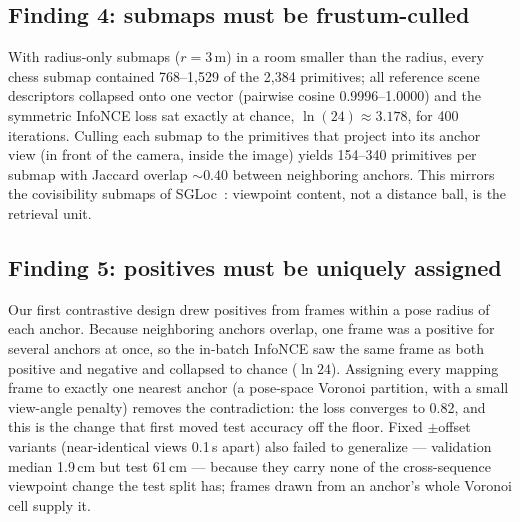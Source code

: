 \documentclass[journal]{IEEEtran}
\begin{document}
\subsection{Finding 4: submaps must be frustum-culled}
With radius-only submaps ($r{=}3$\,m) in a room smaller than the radius,
every chess submap contained 768--1{,}529 of the 2{,}384 primitives; all
reference scene descriptors collapsed onto one vector (pairwise cosine
0.9996--1.0000) and the symmetric InfoNCE loss sat exactly at chance,
$\ln(24) \approx 3.178$, for 400 iterations. Culling each submap to the
primitives that project into its anchor view (in front of the camera, inside
the image) yields 154--340 primitives per submap with Jaccard overlap
${\sim}0.40$ between neighboring anchors. This mirrors the covisibility
submaps of SGLoc~\cite{sgloc}: viewpoint content, not a distance ball, is the
retrieval unit.

\subsection{Finding 5: positives must be uniquely assigned}
Our first contrastive design drew positives from frames within a pose radius
of each anchor. Because neighboring anchors overlap, one frame was a positive
for several anchors at once, so the in-batch InfoNCE saw the same frame as
both positive and negative and collapsed to chance ($\ln 24$). Assigning
every mapping frame to exactly one nearest anchor (a pose-space Voronoi
partition, with a small view-angle penalty) removes the contradiction: the
loss converges to 0.82, and this is the change that first moved test accuracy
off the floor. Fixed $\pm$offset variants (near-identical views 0.1\,s apart)
also failed to generalize --- validation median 1.9\,cm but test 61\,cm ---
because they carry none of the cross-sequence viewpoint change the test split
has; frames drawn from an anchor's whole Voronoi cell supply it.
\end{document}
